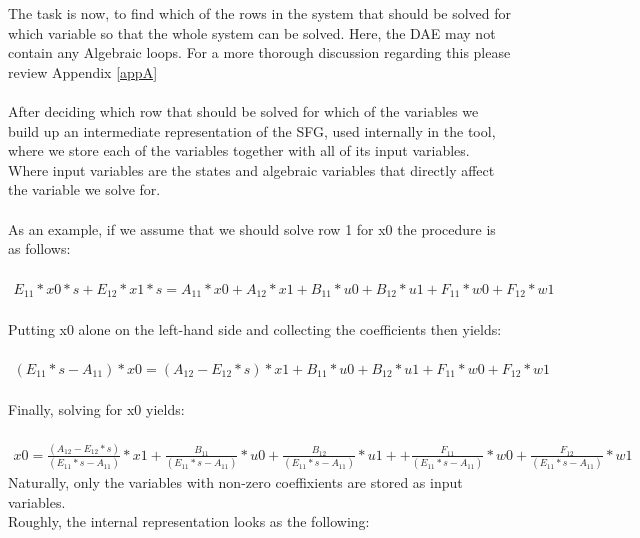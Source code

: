 The task is now, to find which of the rows in the system that should be solved for which variable so that the whole system can be solved. Here, the DAE may not contain any Algebraic loops. For a more thorough discussion regarding this please review Appendix \ref{appA}\\\\After deciding which row that should be solved for which of the variables we build up an intermediate representation of the SFG, used internally in the tool, where we store each of the variables together with all of its input variables. Where input variables are the states and algebraic variables that directly affect the variable we solve for.\\\\
As an example, if we assume that we should solve row 1 for x0 the procedure is as follows:\\\\$\begin{array}{rcl} E_{11}*x0*s  +E_{12}*x1*s=A_{11}*x0  +A_{12}*x1 +B_{11}*u0  +B_{12}*u1  +F_{11}*w0  +F_{12}*w1 \end{array}$\\
\\Putting x0 alone on the left-hand side and collecting the coefficients then yields:\\\\$\begin{array}{rcl} (E_{11}*s-A_{11})*x0  =(A_{12}-E_{12}*s)*x1 +B_{11}*u0  +B_{12}*u1 +F_{11}*w0  +F_{12}*w1 \end{array}$\\\\
Finally, solving for x0 yields:\\\\
$\begin{array}{rcl} x0  = \frac{(A_{12}-E_{12}*s)}{(E_{11}*s-A_{11})}*x1 +\frac{B_{11}}{(E_{11}*s-A_{11})}*u0  +\frac{B_{12}}{(E_{11}*s-A_{11})}*u1 ++\frac{F_{11}}{(E_{11}*s-A_{11})}*w0 +\frac{F_{12}}{(E_{11}*s-A_{11})}*w1\end{array}$\\\newline Naturally, only the variables with non-zero coeffixients are stored as input variables.\\Roughly, the internal representation looks as the following:\\\newline
\setlength\fboxsep{0pt}
\setlength\fboxrule{0.5pt}

